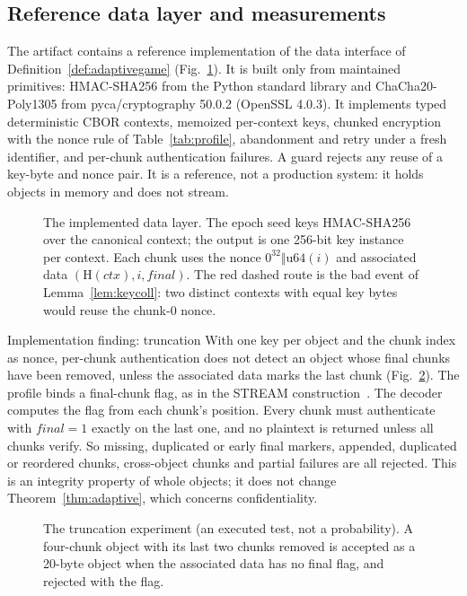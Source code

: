 \documentclass[pdflatex,sn-mathphys-num]{sn-jnl}
\theoremstyle{plain}
\theoremstyle{definition}
\begin{document}
\subsection{Reference data layer and measurements}\label{sec:datalayer}
The artifact contains a reference implementation of the data interface of Definition~\ref{def:adaptivegame} (Fig.~\ref{fig:datalayer}). It is built only from maintained primitives: HMAC-SHA256 from the Python standard library and ChaCha20-Poly1305 from pyca/cryptography 50.0.2 (OpenSSL 4.0.3). It implements typed deterministic CBOR contexts, memoized per-context keys, chunked encryption with the nonce rule of Table~\ref{tab:profile}, abandonment and retry under a fresh identifier, and per-chunk authentication failures. A guard rejects any reuse of a key-byte and nonce pair. It is a reference, not a production system: it holds objects in memory and does not stream.

\begin{figure}[t]
\centering
\resizebox{\linewidth}{!}{}
\caption{The implemented data layer. The epoch seed keys HMAC-SHA256 over the canonical context; the output is one 256-bit key instance per context. Each chunk uses the nonce $0^{32}\Vert\mathrm{u64}(i)$ and associated data $(\mathrm{H}(\mathit{ctx}),i,\mathit{final})$. The red dashed route is the bad event of Lemma~\ref{lem:keycoll}: two distinct contexts with equal key bytes would reuse the chunk-0 nonce.}\label{fig:datalayer}
\end{figure}

\begin{implbox}{Implementation finding: truncation}
With one key per object and the chunk index as nonce, per-chunk authentication does not detect an object whose final chunks have been removed, unless the associated data marks the last chunk (Fig.~\ref{fig:truncation}). The profile binds a final-chunk flag, as in the STREAM construction~\cite{hoang2015}. The decoder computes the flag from each chunk's position. Every chunk must authenticate with $\mathit{final}=1$ exactly on the last one, and no plaintext is returned unless all chunks verify. So missing, duplicated or early final markers, appended, duplicated or reordered chunks, cross-object chunks and partial failures are all rejected. This is an integrity property of whole objects; it does not change Theorem~\ref{thm:adaptive}, which concerns confidentiality.
\end{implbox}

\begin{figure}[htbp]
\centering
\resizebox{\linewidth}{!}{}
\caption{The truncation experiment (an executed test, not a probability). A four-chunk object with its last two chunks removed is accepted as a 20-byte object when the associated data has no final flag, and rejected with the flag.}\label{fig:truncation}
\end{figure}
\end{document}
